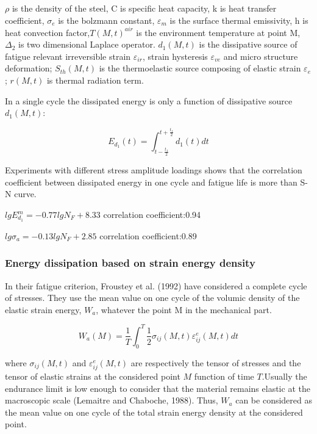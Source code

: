 \documentclass[3p,times,procedia,number]{elsarticle}
\begin{document}
         $\rho$ is the density of the steel, C is specific heat capacity, k is heat transfer coefficient, $\sigma_e$ is the bolzmann constant, $\varepsilon_m$ is the surface thermal emissivity, h is heat convection factor,$T(M,t)^{air}$ is the environment temperature at point M, $\Delta_2$ is two dimensional Laplace operator.  $d_1(M,t)$ is the dissipative source of fatigue relevant irreversible strain $\varepsilon_{ir}$, strain hysteresis $\varepsilon_{ve}$ and micro structure deformation; $S_{th}(M,t)$ is the thermoelastic source composing of elastic strain $\varepsilon_e$; $r(M,t)$ is thermal radiation term.
         
         In a single cycle the dissipated energy is only a function of dissipative source $d_1(M,t)$:
         
         $$E_{d_1}(t)=\int_{t-\frac{t_f}{2}}^{t+\frac{t_f}{2}}d_1(t)dt$$
         
         Experiments with different stress amplitude loadings shows that the correlation coefficient between dissipated energy in one cycle and fatigue life is more than S-N curve.
         
         $lgE_{d_1}^m=-0.77lgN_F+8.33$ correlation coefficient:0.94
         
         $lg\sigma_a=-0.13lgN_F+2.85$ correlation coefficient:0.89
         
         
         \subsubsection{Energy dissipation based on strain energy density}
         In their fatigue criterion, Froustey et al. (1992)  have considered a complete cycle of
         stresses. They use the mean value on one cycle of
         the volumic density of the elastic strain energy, $W_a$, whatever the point
         M in the mechanical part.
         
         $$W_a(M)=\frac{1}{T}\int_{0}^{T}\frac{1}{2}\sigma_{ij}(M,t)\varepsilon_{ij}^e(M,t)dt$$
         
         where $\sigma_{ij}(M,t)$ and $\varepsilon_{ij}^e(M,t)$ are respectively the tensor of stresses and the tensor of
         elastic strains at the considered point $M$ function of time $T$.Usually the endurance limit
         is low enough to consider that the material remains elastic at the macroscopic scale
         (Lemaitre and Chaboche, 1988). Thus, $W_a$ can be considered as the mean value on one
         cycle of the total strain energy density at the considered point.
         
\end{document}
